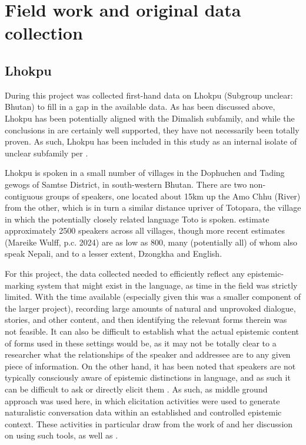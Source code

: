 \appendix
\chapter{Field work and original data collection}\label{s:Methods:FieldMethods}
\section{Lhokpu}
During this project was collected first-hand data on Lhokpu (Subgroup unclear: Bhutan) to fill in a gap in the available data. As has been discussed above, Lhokpu has been potentially aligned with the Dimalish subfamily, and while the conclusions in  are certainly well supported, they have not necessarily been totally proven. As such, Lhokpu has been included in this study as an internal isolate of unclear subfamily per .

Lhokpu is spoken in a small number of villages in the Dophuchen and Tading gewogs of Samtse District, in south-western Bhutan. There are two non-contiguous groups of speakers, one located about 15km up the Amo Chhu (River) from the other, which is in turn a similar distance upriver of Totopara, the village in which the potentially closely related language Toto is spoken.  estimate approximately 2500 speakers across all villages, though more recent estimates (Mareike Wulff, p.c. 2024) are as low as 800, many (potentially all) of whom also speak Nepali, and to a lesser extent, Dzongkha and English.

For this project, the data collected needed to efficiently reflect any epistemic-marking system that might exist in the language, as time in the field was strictly limited. With the time available (especially given this was a smaller component of the larger project), recording large amounts of natural and unprovoked dialogue, stories, and other content, and then identifying the relevant forms therein was not feasible. It can also be difficult to establish what the actual epistemic content of forms used in these settings would be, as it may not be totally clear to a researcher what the relationships of the speaker and addressee are to any given piece of information. On the other hand, it has been noted that speakers are not typically consciously aware of epistemic distinctions in language, and as such it can be difficult to ask or directly elicit them \cites{Gawne2013}{Grzech2020}. As such, as middle ground approach was used here, in which elicitation activities were used to generate naturalistic conversation data within an established and controlled epistemic context. These activities in particular draw from the work of  and her discussion on using such tools, as well as .

